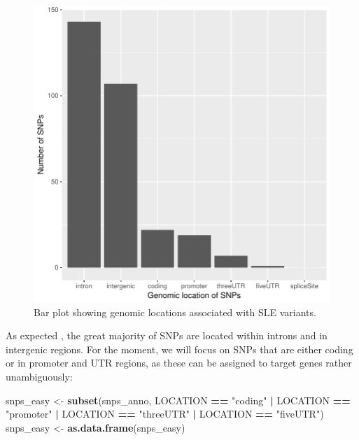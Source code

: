 \documentclass[9pt,a4paper,]{extarticle}
\newenvironment{Shaded}{\begin{snugshade}}{\end{snugshade}}
\newcommand{\KeywordTok}[1]{\textcolor[rgb]{0.13,0.29,0.53}{\textbf{#1}}}
\newcommand{\StringTok}[1]{\textcolor[rgb]{0.31,0.60,0.02}{#1}}
\newcommand{\OperatorTok}[1]{\textcolor[rgb]{0.81,0.36,0.00}{\textbf{#1}}}
\newcommand{\NormalTok}[1]{#1}
\theoremstyle{definition}
\theoremstyle{definition}
\theoremstyle{definition}
\theoremstyle{remark}
\begin{document}
\begin{figure}

{\centering \includegraphics{biocondutor-regulatory-genomics-workflow_files/figure-latex/figure6-1} 

}

\caption{Bar plot showing genomic locations associated with SLE variants.}\label{fig:figure6}
\end{figure}

As expected \citep{Maurano2012}, the great majority of SNPs are located within introns and in intergenic regions.
For the moment, we will focus on SNPs that are either coding or in promoter and UTR regions, as these can be assigned to target genes rather unambiguously:

\begin{Shaded}
\begin{Highlighting}[]
\NormalTok{snps_easy <-}\StringTok{ }\KeywordTok{subset}\NormalTok{(snps_anno, LOCATION }\OperatorTok{==}\StringTok{ "coding"} \OperatorTok{|}\StringTok{ }\NormalTok{LOCATION }\OperatorTok{==}\StringTok{ "promoter"} \OperatorTok{|}\StringTok{ }\NormalTok{LOCATION }\OperatorTok{==}\StringTok{ "threeUTR"} \OperatorTok{|}\StringTok{ }\NormalTok{LOCATION }\OperatorTok{==}\StringTok{ "fiveUTR"}\NormalTok{)}
\NormalTok{snps_easy <-}\StringTok{ }\KeywordTok{as.data.frame}\NormalTok{(snps_easy)}
\end{Highlighting}
\end{Shaded}
\end{document}
